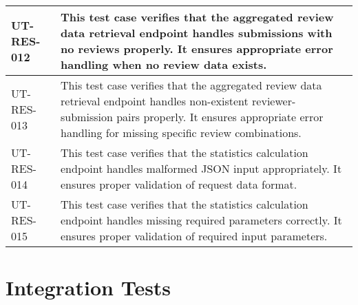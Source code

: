 \begin{longtable}{|p{}|p{}|}
\hline
UT-RES-012 & This test case verifies that the aggregated review data retrieval endpoint handles submissions with no reviews properly. It ensures appropriate error handling when no review data exists. \\
\hline
UT-RES-013 & This test case verifies that the aggregated review data retrieval endpoint handles non-existent reviewer-submission pairs properly. It ensures appropriate error handling for missing specific review combinations. \\
\hline
UT-RES-014 & This test case verifies that the statistics calculation endpoint handles malformed JSON input appropriately. It ensures proper validation of request data format. \\
\hline
UT-RES-015 & This test case verifies that the statistics calculation endpoint handles missing required parameters correctly. It ensures proper validation of required input parameters. \\
\hline
\end{longtable}
\clearpage

\section{Integration Tests}

